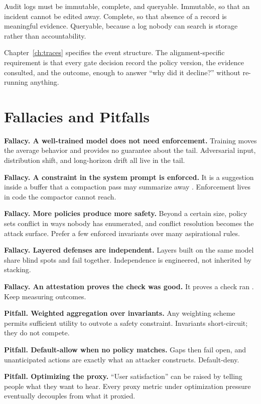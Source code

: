 Audit logs must be immutable, complete, and queryable. Immutable, so that an
incident cannot be edited away. Complete, so that absence of a record is
meaningful evidence. Queryable, because a log nobody can search is storage rather
than accountability.

Chapter~\ref{ch:traces} specifies the event structure. The alignment-specific
requirement is that every gate decision record the policy version, the evidence
consulted, and the outcome, enough to answer ``why did it decline?'' without
re-running anything.

\section{Fallacies and Pitfalls}

\textbf{Fallacy. A well-trained model does not need enforcement.} Training moves
the average behavior and provides no guarantee about the tail. Adversarial input,
distribution shift, and long-horizon drift all live in the tail.

\textbf{Fallacy. A constraint in the system prompt is enforced.} It is a
suggestion inside a buffer that a compaction pass may summarize away
\cite{govdecay2026}. Enforcement lives in code the compactor cannot reach.

\textbf{Fallacy. More policies produce more safety.} Beyond a certain size, policy
sets conflict in ways nobody has enumerated, and conflict resolution becomes the
attack surface. Prefer a few enforced invariants over many aspirational rules.

\textbf{Fallacy. Layered defenses are independent.} Layers built on the same model
share blind spots and fail together. Independence is engineered, not inherited by
stacking.

\textbf{Fallacy. An attestation proves the check was good.} It proves a check ran
\cite{proofguardrail2026}. Keep measuring outcomes.

\textbf{Pitfall. Weighted aggregation over invariants.} Any weighting scheme
permits sufficient utility to outvote a safety constraint. Invariants
short-circuit; they do not compete.

\textbf{Pitfall. Default-allow when no policy matches.} Gaps then fail open, and
unanticipated actions are exactly what an attacker constructs. Default-deny.

\textbf{Pitfall. Optimizing the proxy.} ``User satisfaction'' can be raised by
telling people what they want to hear. Every proxy metric under optimization
pressure eventually decouples from what it proxied.

